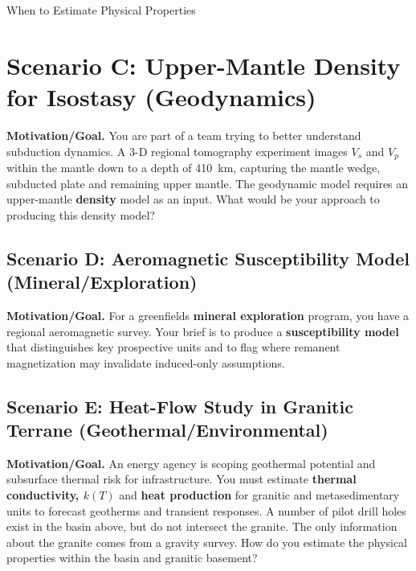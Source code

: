 \begin{activity}{When to Estimate Physical Properties}
\yourplan{}

\newpage
\section*{Scenario C: Upper-Mantle Density for Isostasy (Geodynamics)}
\noindent\textbf{Motivation/Goal.} You are part of a team trying to better understand subduction dynamics.  A 3-D regional tomography experiment images $V_s$ and $V_p$ within the mantle down to a depth of 410~km, capturing the mantle wedge, subducted plate and remaining upper mantle.  The geodynamic model requires an upper-mantle \textbf{density} model as an input.  What would be your approach to producing this density model?

\yourplan{}

\newpage
\subsection*{Scenario D: Aeromagnetic Susceptibility Model (Mineral/Exploration)}
\noindent\textbf{Motivation/Goal.} For a greenfields \textbf{mineral exploration} program, you have a regional aeromagnetic survey. Your brief is to produce a \textbf{susceptibility model} that distinguishes key prospective units and to flag where remanent magnetization may invalidate induced-only assumptions.

\yourplan{}

\newpage
\subsection*{Scenario E: Heat-Flow Study in Granitic Terrane (Geothermal/Environmental)}
\noindent\textbf{Motivation/Goal.} An energy agency is scoping geothermal potential and subsurface thermal risk for infrastructure. You must estimate \textbf{thermal conductivity, $k(T)$} and \textbf{heat production} for granitic and metasedimentary units to forecast geotherms and transient responses.  A number of pilot drill holes exist in the basin above, but do not intersect the granite.  The only information about the granite comes from a gravity survey.  How do you estimate the physical properties within the basin and granitic basement?

\yourplan{}

\newpage

\end{activity}
